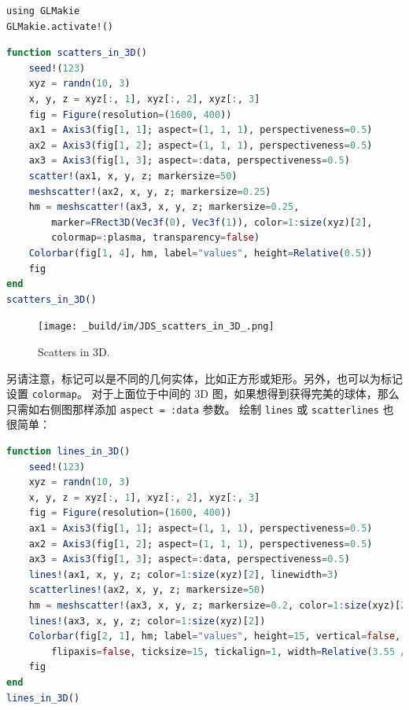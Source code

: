 \documentclass[
  notoc %
]{tufte-book}
\newcommand{\passthrough}[1]{#1}
\begin{document}
\begin{lstlisting}
using GLMakie
GLMakie.activate!()
\end{lstlisting}

\begin{lstlisting}[language=Julia]
function scatters_in_3D()
    seed!(123)
    xyz = randn(10, 3)
    x, y, z = xyz[:, 1], xyz[:, 2], xyz[:, 3]
    fig = Figure(resolution=(1600, 400))
    ax1 = Axis3(fig[1, 1]; aspect=(1, 1, 1), perspectiveness=0.5)
    ax2 = Axis3(fig[1, 2]; aspect=(1, 1, 1), perspectiveness=0.5)
    ax3 = Axis3(fig[1, 3]; aspect=:data, perspectiveness=0.5)
    scatter!(ax1, x, y, z; markersize=50)
    meshscatter!(ax2, x, y, z; markersize=0.25)
    hm = meshscatter!(ax3, x, y, z; markersize=0.25,
        marker=FRect3D(Vec3f(0), Vec3f(1)), color=1:size(xyz)[2],
        colormap=:plasma, transparency=false)
    Colorbar(fig[1, 4], hm, label="values", height=Relative(0.5))
    fig
end
scatters_in_3D()
\end{lstlisting}

\begin{figure}
\hypertarget{fig:scatters_in_3D}{%
\centering
\texttt{[image: \_build/im/JDS\_scatters\_in\_3D\_.png]}
\caption{Scatters in 3D.}\label{fig:scatters_in_3D}
}
\end{figure}

另请注意，标记可以是不同的几何实体，比如正方形或矩形。另外，也可以为标记设置
\passthrough{\lstinline!colormap!}。 对于上面位于中间的 3D
图，如果想得到获得完美的球体，那么只需如右侧图那样添加
\passthrough{\lstinline!aspect = :data!} 参数。 绘制
\passthrough{\lstinline!lines!} 或
\passthrough{\lstinline!scatterlines!} 也很简单：

\begin{lstlisting}[language=Julia]
function lines_in_3D()
    seed!(123)
    xyz = randn(10, 3)
    x, y, z = xyz[:, 1], xyz[:, 2], xyz[:, 3]
    fig = Figure(resolution=(1600, 400))
    ax1 = Axis3(fig[1, 1]; aspect=(1, 1, 1), perspectiveness=0.5)
    ax2 = Axis3(fig[1, 2]; aspect=(1, 1, 1), perspectiveness=0.5)
    ax3 = Axis3(fig[1, 3]; aspect=:data, perspectiveness=0.5)
    lines!(ax1, x, y, z; color=1:size(xyz)[2], linewidth=3)
    scatterlines!(ax2, x, y, z; markersize=50)
    hm = meshscatter!(ax3, x, y, z; markersize=0.2, color=1:size(xyz)[2])
    lines!(ax3, x, y, z; color=1:size(xyz)[2])
    Colorbar(fig[2, 1], hm; label="values", height=15, vertical=false,
        flipaxis=false, ticksize=15, tickalign=1, width=Relative(3.55 / 4))
    fig
end
lines_in_3D()
\end{lstlisting}
\end{document}
